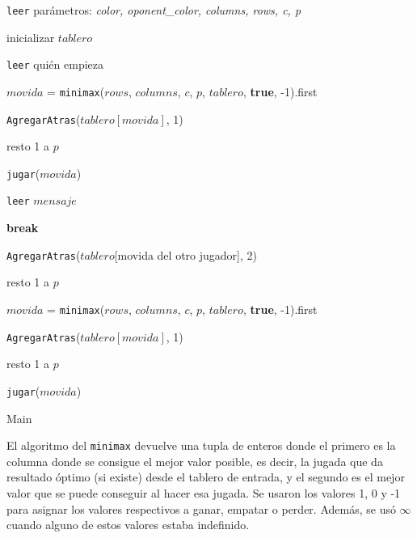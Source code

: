\documentclass[A4paper,oneside,fleqn,11pt]{article}
\theoremstyle{definition}
\begin{document}
\begin{algorithm}
	\texttt{leer} parámetros: \textit{color, oponent\_color, columns, rows, c, p}
	
    inicializar $tablero$

	\texttt{leer} quién empieza

		{
		$movida$ = \texttt{minimax}($rows$, $columns$, $c$, $p$, $tablero$, \textbf{true}, -1).first

		\texttt{AgregarAtras}($tablero[movida]$, 1)

		resto 1 a $p$

		\texttt{jugar}($movida$)		
		}

    	{
    	\texttt{leer} $mensaje$

        	{
        	\textbf{break}
            }

        \texttt{AgregarAtras}($tablero$[movida del otro jugador], 2)        	

		resto 1 a $p$

        $movida$ = \texttt{minimax}($rows$, $columns$, $c$, $p$, $tablero$, \textbf{true}, -1).first

        \texttt{AgregarAtras}($tablero[movida]$, 1)

        resto 1 a $p$

    	\texttt{jugar}($movida$)
    	}
    \caption{Main}   
\end{algorithm}

El algoritmo del \texttt{minimax} devuelve una tupla de enteros donde el primero es la columna donde se consigue el mejor valor posible, es decir, la jugada  que da resultado óptimo (si existe) desde el tablero de entrada, y el segundo es el mejor valor que se puede conseguir al hacer esa jugada. Se usaron los valores 1, 0 y -1 para asignar los valores respectivos a ganar, empatar o perder. Además, se usó $\infty$ cuando alguno de estos valores estaba indefinido.

\newpage
\end{document}
